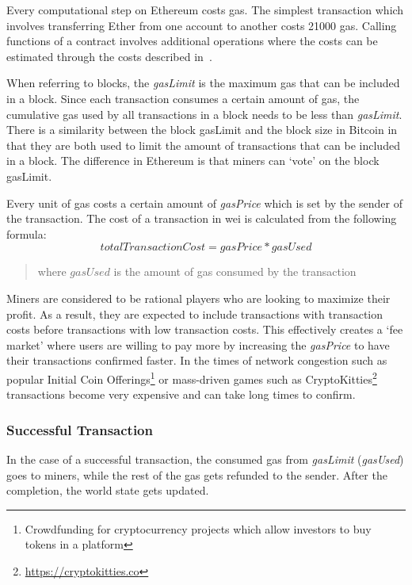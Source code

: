 Every computational step on Ethereum costs gas. The simplest transaction which involves transferring Ether from one account to another costs 21000 gas. Calling functions of a contract involves additional operations where the costs can be estimated through the costs described in~\cite{gas, ethereum}. 

When referring to blocks, the \textit{gasLimit} is the maximum gas that can be included in a block. Since each transaction consumes a certain amount of gas, the cumulative gas used by all transactions in a block needs to be less than \textit{gasLimit}. There is a similarity between the block gasLimit and the block size in Bitcoin in that they are both used to limit the amount of transactions that can be included in a block. The difference in Ethereum is that miners can `vote' on the block gasLimit.

Every unit of gas costs a certain amount of \textit{gasPrice} which is set by the sender of the transaction. The cost of a transaction in wei is calculated from the following formula:
\begin{equation}
    totalTransactionCost = gasPrice * gasUsed
\end{equation}
\begin{quote}
    \noindent
    where $gasUsed$ is the amount of gas consumed by the transaction
\end{quote}

Miners are considered to be rational players who are looking to maximize their profit. As a result, they are expected to include transactions with transaction costs before transactions with low transaction costs. This effectively creates a `fee market'  where users are willing to pay more by increasing the \textit{gasPrice} to have their transactions confirmed faster. In the times of network congestion such as popular Initial Coin Offerings\footnote{Crowdfunding for cryptocurrency projects which allow investors to buy tokens in a platform}\cite{batico} or mass-driven games such as CryptoKitties\footnote{\url{https://cryptokitties.co}}\cite{cryptokitties} transactions become very expensive and can take long times to confirm.

\subsubsection{Successful Transaction}
In the case of a successful transaction, the consumed gas from \textit{gasLimit} (\textit{gasUsed}) goes to miners, while the rest of the gas gets refunded to the sender. After the completion, the world state gets updated.

